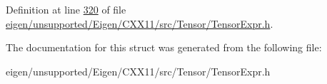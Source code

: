 Definition at line \hyperlink{eigen_2unsupported_2_eigen_2_c_x_x11_2src_2_tensor_2_tensor_expr_8h_source_l00320}{320} of file \hyperlink{eigen_2unsupported_2_eigen_2_c_x_x11_2src_2_tensor_2_tensor_expr_8h_source}{eigen/unsupported/\+Eigen/\+C\+X\+X11/src/\+Tensor/\+Tensor\+Expr.\+h}.



The documentation for this struct was generated from the following file\+:\begin{DoxyCompactItemize}
\item 
eigen/unsupported/\+Eigen/\+C\+X\+X11/src/\+Tensor/\+Tensor\+Expr.\+h\end{DoxyCompactItemize}
